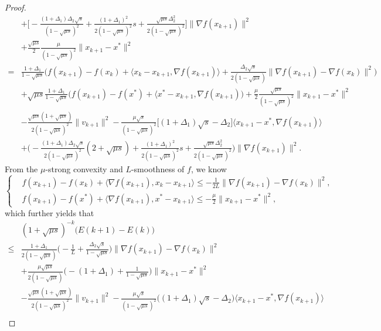 \documentclass[11pt]{article}
\newcommand{\1}{\mathbf 1}
\numberwithin{equation}{section}
\begin{document}
\begin{proof}
{\begin{align*}
        &+\big[-\frac{(1+\Delta_1)\Delta_2\sqrt{s}}{(1-\sqrt{\mu s})^2}+\frac{(1+\Delta_1)^2}{2(1-\sqrt{\mu s})^2}s+\frac{\sqrt{\mu s}\Delta_2^2}{2(1-\sqrt{\mu s})^2}\big]\|\nabla f(x_{k+1})\|^2\\
        &+\frac{\sqrt{\mu s}}{2}\frac{\mu}{(1-\sqrt{\mu s})^2}\|x_{k+1}-x^*\|^2\\
        =&\frac{1+\Delta_1}{1-\sqrt{\mu s}}\big(f(x_{k+1})-f(x_k)+\langle x_k-x_{k+1}, \nabla f(x_{k+1})\rangle + \frac{\Delta_2\sqrt{s}}{2(1-\sqrt{\mu s})}\|\nabla f(x_{k+1})-\nabla f(x_k)\|^2\big)\\
        &+\sqrt{\mu s}\frac{1+\Delta_1}{1-\sqrt{\mu s}}\big(f(x_{k+1})-f(x^*)+\langle x^*-x_{k+1}, \nabla f(x_{k+1})\big)+\frac{\mu}{2}\frac{\sqrt{\mu s}}{(1-\sqrt{\mu s})^2}\|x_{k+1}-x^*\|^2\\
        &-\frac{\sqrt{\mu s}(1+\sqrt{\mu s})}{2(1-\sqrt{\mu s})^2}\|v_{k+1}\|^2-\frac{\mu\sqrt{s}}{(1-\sqrt{\mu s})^2}\big[(1+\Delta_1)\sqrt{s}-\Delta_2\big]\langle x_{k+1}-x^*, \nabla f(x_{k+1})\rangle\\
        &+\big(-\frac{(1+\Delta_1)\Delta_2\sqrt{s}}{2(1-\sqrt{\mu s})^2}(2+\sqrt{\mu s})+\frac{(1+\Delta_1)^2}{2(1-\sqrt{\mu s})^2}s+\frac{\sqrt{\mu s}\Delta_2^2}{2(1-\sqrt{\mu s})^2}\big)\|\nabla f(x_{k+1})\|^2.
       \end{align*}
    }
    From the $\mu$-strong convexity and $L$-smoothness of $f$, we know 
	\begin{equation*}
		\left\{
		\begin{aligned}
			&f(x_{k+1})-f(x_k)+\langle \nabla f(x_{k+1}),x_k-x_{k+1}\rangle \leqslant -\frac{1}{2L}\|\nabla f(x_{k+1})-\nabla f(x_k)\|^2,\\
			&f(x_{k+1})-f(x^*)+\langle \nabla f(x_{k+1}),x^*-x_{k+1}\rangle\leqslant -\frac{\mu}{2}\|x_{k+1}-x^*\|^2,
		\end{aligned}
		\right.
	\end{equation*}
which further yields that
{
        \begin{align*}
            &(1+\sqrt{\mu s})^{-k}\big(E(k+1)-E(k)\big)\\
            \leqslant & \frac{1+\Delta_1}{2(1-\sqrt{\mu s})}\big(-\frac{1}{L}+\frac{\Delta_2\sqrt{s}}{1-\sqrt{\mu s}}\big)\|\nabla f(x_{k+1})-\nabla f(x_{k})\|^2\\
            &+\frac{\mu\sqrt{\mu s}}{2(1-\sqrt{\mu s})}\big(-(1+\Delta_1)+\frac{1}{1-\sqrt{\mu s}}\big)\|x_{k+1}-x^*\|^2\\
            &-\frac{\sqrt{\mu s}(1+\sqrt{\mu s})}{2(1-\sqrt{\mu s})^2}\|v_{k+1}\|^2-\frac{\mu\sqrt{s}}{(1-\sqrt{\mu s})^2}\big((1+\Delta_1)\sqrt{s}-\Delta_2\big)\langle x_{k+1}-x^*,\nabla f(x_{k+1})\rangle\\

\end{align*}}
\end{proof}
\end{document}
